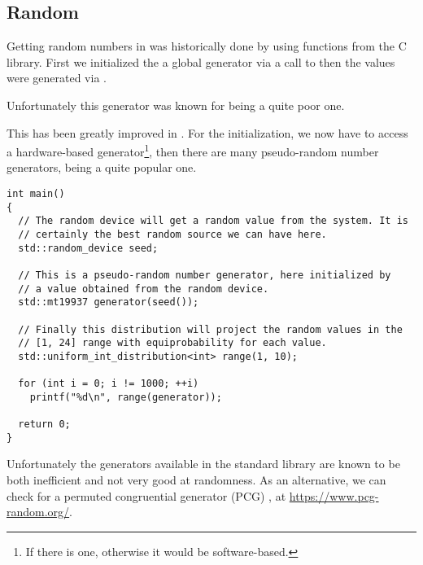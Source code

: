 \subsection{Random}

Getting random numbers in \cpp{} was historically done by using
functions from the C library. First we initialized the a global
generator via a call to  then the values were generated
via .

Unfortunately this generator was known for being a quite poor one.

%
%
This has been greatly improved in . For the initialization, we
now have  to access a hardware-based
generator\footnote{If there is one, otherwise it would be
  software-based.}, then there are many pseudo-random number
generators,  being a quite popular one.

\begin{lstlisting}
int main()
{
  // The random device will get a random value from the system. It is
  // certainly the best random source we can have here.
  std::random_device seed;

  // This is a pseudo-random number generator, here initialized by
  // a value obtained from the random device.
  std::mt19937 generator(seed());

  // Finally this distribution will project the random values in the
  // [1, 24] range with equiprobability for each value.
  std::uniform_int_distribution<int> range(1, 10);

  for (int i = 0; i != 1000; ++i)
    printf("%d\n", range(generator));

  return 0;
}
\end{lstlisting}

Unfortunately the generators available in the standard library are
known to be both inefficient and not very good at randomness. As an
alternative, we can check for a permuted congruential generator (PCG)
\cite{pcg}, at \url{https://www.pcg-random.org/}.
